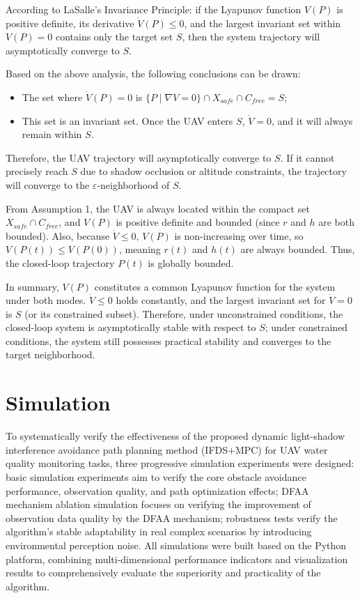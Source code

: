 \documentclass[final,3p,times,numbers]{elsarticle}
\begin{document}
According to LaSalle's Invariance Principle: if the Lyapunov function $V(P)$ is positive definite, its derivative $\dot{V}(P) \le 0$, and the largest invariant set within $V(P)=0$ contains only the target set $S$, then the system trajectory will asymptotically converge to $S$.

Based on the above analysis, the following conclusions can be drawn:
\begin{itemize}
    \item The set where $\dot{V}(P)=0$ is $\{P \mid \nabla V=0\} \cap X_{safe} \cap C_{free} = S$;
    \item This set is an invariant set. Once the UAV enters $S$, $\dot{V}=0$, and it will always remain within $S$.
\end{itemize}
Therefore, the UAV trajectory will asymptotically converge to $S$. If it cannot precisely reach $S$ due to shadow occlusion or altitude constraints, the trajectory will converge to the $\varepsilon$-neighborhood of $S$.

From Assumption 1, the UAV is always located within the compact set $X_{safe} \cap C_{free}$, and $V(P)$ is positive definite and bounded (since $r$ and $h$ are both bounded). Also, because $\dot{V} \le 0$, $V(P)$ is non-increasing over time, so $V(P(t)) \le V(P(0))$, meaning $r(t)$ and $h(t)$ are always bounded. Thus, the closed-loop trajectory $P(t)$ is globally bounded.

In summary, $V(P)$ constitutes a common Lyapunov function for the system under both modes. $\dot{V} \le 0$ holds constantly, and the largest invariant set for $\dot{V}=0$ is $S$ (or its constrained subset). Therefore, under unconstrained conditions, the closed-loop system is asymptotically stable with respect to $S$; under constrained conditions, the system still possesses practical stability and converges to the target neighborhood.


\section{Simulation}

To systematically verify the effectiveness of the proposed dynamic light-shadow interference avoidance path planning method (IFDS+MPC) for UAV water quality monitoring tasks, three progressive simulation experiments were designed: basic simulation experiments aim to verify the core obstacle avoidance performance, observation quality, and path optimization effects; DFAA mechanism ablation simulation focuses on verifying the improvement of observation data quality by the DFAA mechanism; robustness tests verify the algorithm's stable adaptability in real complex scenarios by introducing environmental perception noise. All simulations were built based on the Python platform, combining multi-dimensional performance indicators and visualization results to comprehensively evaluate the superiority and practicality of the algorithm.
\end{document}
